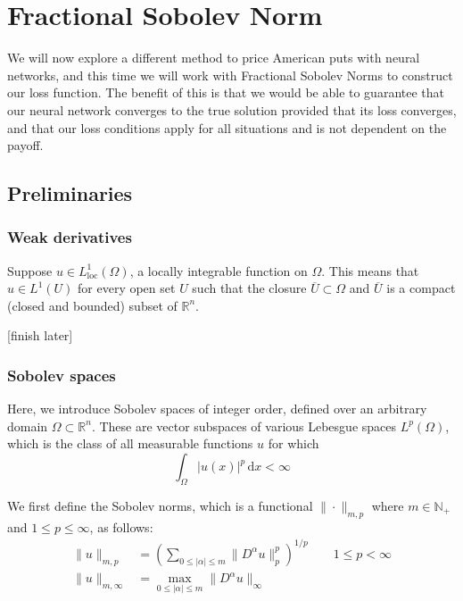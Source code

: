 \chapter{Fractional Sobolev Norm}

We will now explore a different method to price American puts with neural networks, and this time we will work with Fractional Sobolev Norms to construct our loss function. The benefit of this is that we would be able to guarantee that our neural network converges to the true solution provided that its loss converges, and that our loss conditions apply for all situations and is not dependent on the payoff.

\section{Preliminaries}

\subsection{Weak derivatives}

Suppose $u \in L_\text{loc}^1(\Omega)$, a locally integrable function on $\Omega$. This means that $u \in L^1(U)$ for every open set $U$ such that the closure $\overline U \subset \Omega$ and $\overline U$ is a compact (closed and bounded) subset of $\mathbb R^n$.

[finish later]

\subsection{Sobolev spaces}

Here, we introduce Sobolev spaces of integer order, defined over an arbitrary domain $\Omega \subset \mathbb R^n$. These are vector subspaces of various Lebesgue spaces $L^p(\Omega)$, which is the class of all measurable functions $u$ for which
\[\int_\Omega |u(x)|^p \,\mathrm dx < \infty\]

We first define the Sobolev norms, which is a functional $\|\cdot\|_{m, p}$ where $m \in \mathbb N_+$ and $1 \le p \le \infty$, as follows:
\begin{align*}
    \|u\|_{m, p} &= \left(\sum_{0 \le |\alpha|\le m} \|D^\alpha u\|^p_p\right)^{1/p} \qquad  1 \le p < \infty \\
    \|u\|_{m, \infty} &= \max_{0 \le |\alpha| \le m }\|D^\alpha u\|_\infty
\end{align*}

